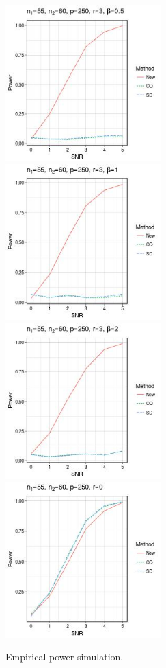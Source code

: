 \documentclass[review]{elsarticle}
\theoremstyle{plain}
\theoremstyle{definition}
\theoremstyle{remark}
\begin{document}
\begin{figure}
    \centering 
    \includegraphics[height=6cm]{code/fig5.jpeg}
    \includegraphics[height=6cm]{code/fig6.jpeg}
    \\
    \includegraphics[height=6cm]{code/fig7.jpeg}
    \includegraphics[height=6cm]{code/fig8.jpeg}
    \caption{Empirical power simulation.}\label{fig:fig2}
\end{figure}
\end{document}
